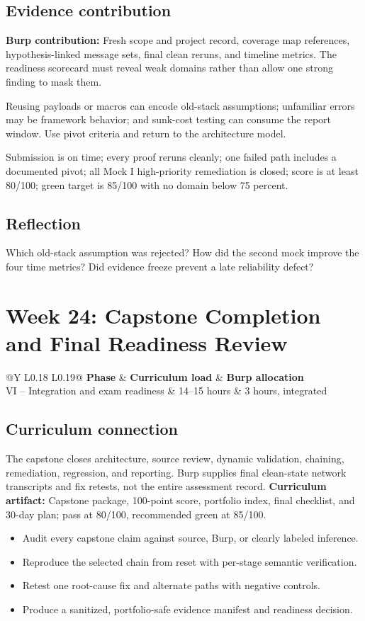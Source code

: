\documentclass[11pt]{article}
\makeatletter
\newcommand{\weekheader}[5]{%
  \clearpage
  \section{Week #1: #2}
  \begin{tcolorbox}[colback=Navy,colframe=Navy,coltext=white]
    \begin{tabularx}{\linewidth}{@{}Y L{0.18\linewidth} L{0.19\linewidth}@{}}
      \textbf{Phase} & \textbf{Curriculum load} & \textbf{Burp allocation}\\
      #3 & #4 hours & #5 hours, integrated
    \end{tabularx}
  \end{tcolorbox}
}
\newcommand{\weekfield}[2]{%
  \Needspace{5\baselineskip}
  \subsection*{#1}
  #2
}
\newcommand{\curriculumartifact}[1]{\textbf{Curriculum artifact:} #1}
\newcommand{\burpevidence}[1]{\textbf{Burp contribution:} #1}
\makeatother
\begin{document}
\weekfield{Evidence contribution}{\burpevidence{Fresh scope and project record,
coverage map references, hypothesis-linked message sets, final clean reruns, and
timeline metrics.} The readiness scorecard must reveal weak domains rather than
allow one strong finding to mask them.}

\begin{troubleshootingbox}
Reusing payloads or macros can encode old-stack assumptions; unfamiliar errors
may be framework behavior; and sunk-cost testing can consume the report window.
Use pivot criteria and return to the architecture model.
\end{troubleshootingbox}

\begin{checkpoints}
Submission is on time; every proof reruns cleanly; one failed path includes a
documented pivot; all Mock I high-priority remediation is closed; score is at
least 80/100; green target is 85/100 with no domain below 75 percent.
\end{checkpoints}

\weekfield{Reflection}{Which old-stack assumption was rejected? How did the
second mock improve the four time metrics? Did evidence freeze prevent a late
reliability defect?}

\weekheader{24}{Capstone Completion and Final Readiness Review}{VI -- Integration and exam readiness}{14--15}{3}

\weekfield{Curriculum connection}{The capstone closes architecture, source
review, dynamic validation, chaining, remediation, regression, and reporting.
Burp supplies final clean-state network transcripts and fix retests, not the
entire assessment record. \curriculumartifact{Capstone package, 100-point score,
portfolio index, final checklist, and 30-day plan; pass at 80/100, recommended
green at 85/100.}}

\begin{objectivebox}
\begin{itemize}
  \item Audit every capstone claim against source, Burp, or clearly labeled inference.
  \item Reproduce the selected chain from reset with per-stage semantic verification.
  \item Retest one root-cause fix and alternate paths with negative controls.
  \item Produce a sanitized, portfolio-safe evidence manifest and readiness decision.
\end{itemize}
\end{objectivebox}
\end{document}
